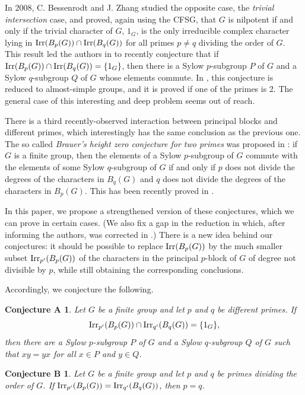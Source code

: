 \documentclass[12pt,leqno,a4paper]{amsart}
\def\irr#1{{\rm Irr}(#1)}
\def\irrp#1#2{{\rm Irr}_{#1'}(#2)}
\newtheorem*{conjA}{Conjecture A}
\newtheorem*{conjB}{Conjecture B}
\theoremstyle{remark}
\begin{document}
\medskip

In 2008, C. Bessenrodt and J. Zhang \cite{BZ} studied the opposite case, the {\sl trivial intersection} 
case, and proved, again using the CFSG,
 that $G$ is nilpotent if and only if the trivial character of $G$, $1_G$, is the only irreducible complex character lying in $\irr{B_p(G)} \cap \irr{B_q(G)}$
for all primes $p \ne q$ dividing the order of $G$. This result  led the authors in \cite{LWXZ} to recently conjecture that
if $\irr{B_p(G)} \cap \irr{B_q(G)}=\{ 1_G\}$, then there is a Sylow $p$-subgroup
$P$ of $G$ and a Sylow $q$-subgroup $Q$ of $G$ whose elements commute.
In \cite{LWXZ}, this conjecture is reduced to almost-simple groups, and it is proved if one of the 
primes is 2. The general case of this interesting and deep problem seems out of reach.

\medskip 
There is a third recently-observed interaction between principal blocks and different primes,  which interestingly has the same
conclusion as the previous one. The
so called {\sl Brauer's height zero conjecture for two primes} was proposed in \cite{MN20}:
if $G$ is a finite group, then the elements of a Sylow $p$-subgroup of $G$ commute with 
the elements of some Sylow $q$-subgroup of $G$
if and only if $p$ does not divide the degrees of the characters in $B_q(G)$ and $q$ does not divide
the degrees of the characters in $B_p(G)$. This has been recently proved in \cite{LWWZ}.

\medskip

In this paper, we propose a strengthened version of these conjectures, which we can prove in certain cases.   (We also fix a gap in the  reduction in \cite{LWXZ} which, after informing the authors,   was corrected in \cite{LWXZ2}.)
There is a new idea behind our conjectures:   it should be possible to replace $\irr{B_p(G)}$ by
the much smaller subset $\irrp{p}{B_p(G)}$ of the characters in the 
principal $p$-block of $G$ of degree not divisible by $p$, while still obtaining the corresponding conclusions.
\medskip


Accordingly, we conjecture the following.
\medskip
\begin{conjA}
Let $G$ be a finite group and let $p$ and $q$ be different primes.
If $$\irrp{p}{B_p(G)} \cap  \irrp{q}{B_q(G)}=\{1_G\},$$
then there are a Sylow $p$-subgroup $P$ of $G$
and a Sylow $q$-subgroup $Q$ of $G$ such that $xy=yx$ for all
$x \in P$ and $y \in Q$.
\end{conjA}

\begin{conjB}
Let $G$ be a finite group and let $p$ and $q$ be primes dividing the order of $G$.
If $\irrp{p}{B_p(G)}=\irrp{q}{B_q(G)}$, then $p=q$.
\end{conjB}
\end{document}

